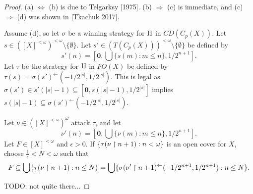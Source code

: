 \documentclass[11pt]{article}
\theoremstyle{plain}
\theoremstyle{definition}
\theoremstyle{remark}
\theoremstyle{plain}
\theoremstyle{definition}
\theoremstyle{remark}
\begin{document}
\begin{proof}
(a) \(\Leftrightarrow\) (b) is due to Telgarksy [1975].
(b) \(\Rightarrow\) (c) is immediate, and
(c) \(\Rightarrow\) (d) was shown in [Tkachuk 2017].

Assume (d), so
let \(\sigma\) be a winning strategy for \(\mathrm{II}\) in \(CD(C_p(X))\).
Let \(s\in([X]^{<\omega})^{<\omega}\setminus\{\emptyset\}\).
Let \(s'\in(T(C_p(X)))^{<\omega}\setminus\{\emptyset\}\)
be defined by \[s'(n)=[\mathbf 0,\bigcup\{s(m):m\leq n\},1/2^{n+1}].\]
Let \(\tau\) be the strategy for \(\mathrm{II}\) in \(FO(X)\)
be defined by \(\tau(s)=\sigma(s')^{\leftarrow}(-1/2^{|s|},1/2^{|s|})\).
This is legal as 
\(\sigma(s')\in s'(|s|-1)\subseteq[\mathbf 0,s(|s|-1),1/2^{|s|}]\)
implies \(s(|s|-1)\subseteq\sigma(s')^{\leftarrow}(-1/2^{|s|},1/2^{|s|})\).

Let \(\nu\in([X]^{<\omega})^\omega\) attack \(\tau\), and let
\[\nu'(n)=[\mathbf 0,\bigcup\{\nu(m):m\leq n\},1/2^{n+1}].\]
Let \(F\in[X]^{<\omega}\) and \(\epsilon>0\).
If \(\{\tau(\nu\restriction n+1):n<\omega\}\) is an open cover for \(X\),
choose \(\frac{1}{\epsilon}<N<\omega\) such that 
\[
  F
    \subseteq
  \bigcup\{\tau(\nu\restriction n+1):n\leq N\}
    =
  \bigcup\{\sigma(\nu'\restriction n+1)^{\leftarrow}(-1/2^{n+1},1/2^{n+1}):n\leq N\}
.\]

TODO: not quite there...


%
\end{proof}

  
  
\end{document}
